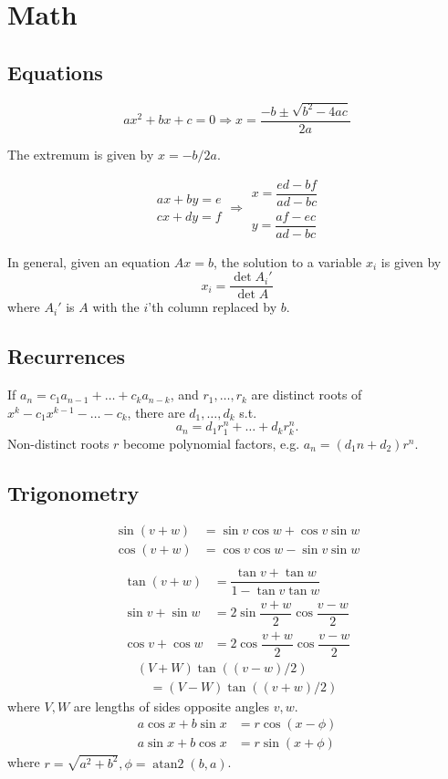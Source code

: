 
\chapter{Math}

\section{Equations}
\[ax^2+bx+c=0 \Rightarrow x = \frac{-b\pm\sqrt{b^2-4ac}}{2a}\]

The extremum is given by $x = -b/2a$.

\[\begin{aligned}ax+by=e\\cx+dy=f\end{aligned}
\Rightarrow
\begin{aligned}x=\dfrac{ed-bf}{ad-bc}\\y=\dfrac{af-ec}{ad-bc}\end{aligned}\]

In general, given an equation $Ax = b$, the solution to a variable $x_i$ is given by
\[x_i = \frac{\det A_i'}{\det A} \]
where $A_i'$ is $A$ with the $i$'th column replaced by $b$.

\section{Recurrences}
If $a_n = c_1 a_{n-1} + \dots + c_k a_{n-k}$, and $r_1, \dots, r_k$ are distinct roots of $x^k - c_1 x^{k-1} - \dots - c_k$, there are $d_1, \dots, d_k$ s.t.
\[a_n = d_1r_1^n + \dots + d_kr_k^n. \]
Non-distinct roots $r$ become polynomial factors, e.g. $a_n = (d_1n + d_2)r^n$.

\section{Trigonometry}
\begin{align*}
\sin(v+w)&{}=\sin v\cos w+\cos v\sin w\\
\cos(v+w)&{}=\cos v\cos w-\sin v\sin w\\
\end{align*}
\begin{align*}
\tan(v+w)&{}=\dfrac{\tan v+\tan w}{1-\tan v\tan w}\\
\sin v+\sin w&{}=2\sin\dfrac{v+w}{2}\cos\dfrac{v-w}{2}\\
\cos v+\cos w&{}=2\cos\dfrac{v+w}{2}\cos\dfrac{v-w}{2}
\end{align*}
\[
\begin{aligned}
  (V+W)\tan((v-w)/2) \\
  \quad = (V-W)\tan((v+w)/2)
\end{aligned}
\]
where $V, W$ are lengths of sides opposite angles $v, w$.
\begin{align*}
	a\cos x+b\sin x&=r\cos(x-\phi)\\
	a\sin x+b\cos x&=r\sin(x+\phi)
\end{align*}
where $r=\sqrt{a^2+b^2}, \phi=\operatorname{atan2}(b,a)$.

